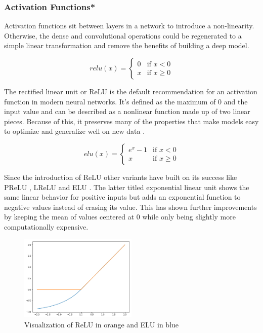 \subsubsection{Activation Functions*}

Activation functions sit between layers in a network to introduce a non-linearity. Otherwise, the dense and convolutional operations could be regenerated to a simple linear transformation and remove the benefits of building a deep model.

\[
relu(x) =
\begin{cases} 
0 & \text{if } x < 0  \\
x & \text{if } x \geq 0
\end{cases}
\]

The rectified linear unit or ReLU \cite{Nair} is the default recommendation for an activation function in modern neural networks. It's defined as the maximum of 0 and the input value and can be described as a nonlinear function made up of two linear pieces. Because of this, it preserves many of the properties that make models easy to optimize and generalize well on new data \cite{Goodfellow2016}.

\[
elu(x) =
\begin{cases} 
e^x - 1 & \text{if } x < 0  \\
x & \text{if } x \geq 0
\end{cases}
\]

Since the introduction of ReLU other variants have built on its success like PReLU \cite{He2015a}, LReLU and ELU \cite{Clevert2015}. The latter titled exponential linear unit shows the same linear behavior for positive inputs but adds an exponential function to negative values instead of erasing its value.  This has shown further improvements by keeping the mean of values centered at 0 while only being slightly more computationally expensive.

\begin{figure}[H]
\centering
\par
\includegraphics[width=0.5\textwidth]{imgs/elu_relu1.png}
\caption{Visualization of ReLU in orange and ELU in blue}
\par
\end{figure}

